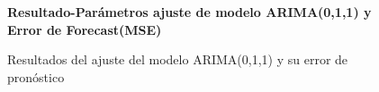 %
%
\begin{figure}[h]
	\centering
	\textbf{Resultado-Parámetros ajuste de modelo ARIMA(0,1,1) y Error de Forecast(MSE)}\par\medskip
	\caption{Resultados del ajuste del modelo ARIMA(0,1,1) y su error de pronóstico}\label{fig24}
\end{figure}
